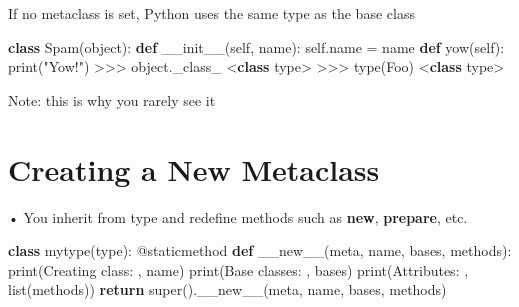 \documentclass[
  letterpaper,
  DIV=11,
  numbers=noendperiod]{scrreprt}
\newenvironment{Shaded}{\begin{snugshade}}{\end{snugshade}}
\newcommand{\AttributeTok}[1]{\textcolor[rgb]{0.40,0.45,0.13}{#1}}
\newcommand{\BuiltInTok}[1]{\textcolor[rgb]{0.00,0.23,0.31}{#1}}
\newcommand{\ControlFlowTok}[1]{\textcolor[rgb]{0.00,0.23,0.31}{\textbf{#1}}}
\newcommand{\FunctionTok}[1]{\textcolor[rgb]{0.28,0.35,0.67}{#1}}
\newcommand{\KeywordTok}[1]{\textcolor[rgb]{0.00,0.23,0.31}{\textbf{#1}}}
\newcommand{\NormalTok}[1]{\textcolor[rgb]{0.00,0.23,0.31}{#1}}
\newcommand{\OperatorTok}[1]{\textcolor[rgb]{0.37,0.37,0.37}{#1}}
\newcommand{\StringTok}[1]{\textcolor[rgb]{0.13,0.47,0.30}{#1}}
\newcommand{\VariableTok}[1]{\textcolor[rgb]{0.07,0.07,0.07}{#1}}
\begin{document}
If no metaclass is set, Python uses the same type as the base class

\begin{Shaded}
\begin{Highlighting}[]
\KeywordTok{class}\NormalTok{ Spam(}\BuiltInTok{object}\NormalTok{): }\KeywordTok{def} \FunctionTok{\_\_init\_\_}\NormalTok{(}\VariableTok{self}\NormalTok{, name): }\VariableTok{self}\NormalTok{.name }\OperatorTok{=}\NormalTok{ name }\KeywordTok{def}\NormalTok{ yow(}\VariableTok{self}\NormalTok{): }\BuiltInTok{print}\NormalTok{(}\StringTok{"Yow!"}\NormalTok{) }\OperatorTok{\textgreater{}\textgreater{}\textgreater{}} \BuiltInTok{object}\NormalTok{.\_class\_ }\OperatorTok{\textless{}}\KeywordTok{class} \StringTok{\textquotesingle{}type\textquotesingle{}}\OperatorTok{\textgreater{}} \OperatorTok{\textgreater{}\textgreater{}\textgreater{}} \BuiltInTok{type}\NormalTok{(Foo) }\OperatorTok{\textless{}}\KeywordTok{class} \StringTok{\textquotesingle{}type\textquotesingle{}}\OperatorTok{\textgreater{}} 
\end{Highlighting}
\end{Shaded}

Note: this is why you rarely see it


\chapter{Creating a New Metaclass}\label{creating-a-new-metaclass}

• You inherit from type and redefine methods such as \textbf{new},
\textbf{prepare}, etc.

\begin{Shaded}
\begin{Highlighting}[]
\KeywordTok{class}\NormalTok{ mytype(}\BuiltInTok{type}\NormalTok{):}
    \AttributeTok{@staticmethod}
    \KeywordTok{def} \FunctionTok{\_\_new\_\_}\NormalTok{(meta, name, bases, methods):}
        \BuiltInTok{print}\NormalTok{(}\StringTok{\textquotesingle{}Creating class: \textquotesingle{}}\NormalTok{, name)}
        \BuiltInTok{print}\NormalTok{(}\StringTok{\textquotesingle{}Base classes: \textquotesingle{}}\NormalTok{, bases)}
        \BuiltInTok{print}\NormalTok{(}\StringTok{\textquotesingle{}Attributes: \textquotesingle{}}\NormalTok{, }\BuiltInTok{list}\NormalTok{(methods))}
    \ControlFlowTok{return} \BuiltInTok{super}\NormalTok{().}\FunctionTok{\_\_new\_\_}\NormalTok{(meta, name, bases, methods) }
\end{Highlighting}
\end{Shaded}
\end{document}
